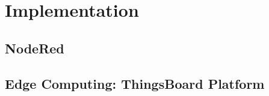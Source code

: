 \section{Implementation}



\subsection{NodeRed}


\clearpage
\subsection{Edge Computing: ThingsBoard Platform}

